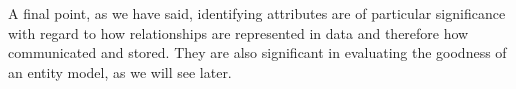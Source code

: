 \mynote A final point, as we have said, identifying attributes are of particular significance with regard to 
 how relationships are represented in data and therefore how communicated and stored.
They are also significant in evaluating the goodness of an entity model, as we will see later.





 
